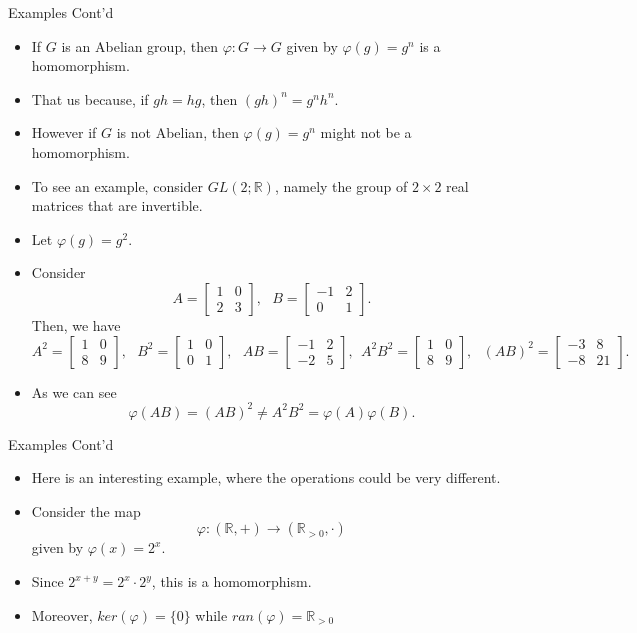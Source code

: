 \documentclass[ %
 10pt, xcolor={dvipsnames,svgnames,x11names,hyperref},
   hyperref={colorlinks=true,citecolor=green,linkcolor=DarkRed,urlcolor=ProcessBlue,anchorcolor=blue}
  ]{beamer}
\newenvironment{stepitemize}{\begin{itemize}[<+->]}{\end{itemize} }
\newcommand{\R}{\mathbb{R}}
\begin{document}
\begin{frame}{Examples Cont'd}
\begin{stepitemize}
    \item If $G$ is an Abelian group, then $\varphi:G\rightarrow G$ given by $\varphi(g)=g^n$ is a homomorphism.
    \item That us because, if $gh=hg$, then $(gh)^n=g^nh^n$.
    \item However if $G$ is not Abelian, then $\varphi(g)=g^n$ might not be a homomorphism.
    \item To see an example, consider $GL(2;\R)$, namely the group of $2\times 2$ real matrices that are invertible. \item Let $\varphi(g)=g^2$.
 \item Consider
 $$ A=\begin{bmatrix}
    1&0\\
    2&3    \end{bmatrix}, \:\:\: B = \begin{bmatrix}
    -1&2\\
    0&1    \end{bmatrix}.$$
    Then, we have
    \scriptsize{
    $$A^2 = \begin{bmatrix}
    1&0\\
    8&9    \end{bmatrix}, \:\:\: B^2 = \begin{bmatrix}
    1&0\\
    0&1    \end{bmatrix}, \:\:\: AB = \begin{bmatrix}
    -1&2\\
    -2&5    \end{bmatrix}, \:\: A^2B^2 = \begin{bmatrix}
    1&0\\
    8&9    \end{bmatrix}, \:\:\: (AB)^2 = \begin{bmatrix}
    -3&8\\
    -8&21    \end{bmatrix}.$$ }
    \item As we can see $$\varphi(AB) = (AB)^2 \neq A^2B^2 =\varphi(A)\varphi(B).$$
\end{stepitemize}

\end{frame}
\begin{frame}{Examples Cont'd}
\begin{stepitemize}
    \item Here is an interesting example, where the operations could be very different.
    \item Consider the map
$$\varphi: \left( \R, +\right) \rightarrow  \left (\R_{>0}, \cdot \right )$$ given by
$\varphi(x)=2^x$.
\item Since $2^{x+y} = 2^x\cdot 2^y$, this is a homomorphism. \item Moreover, $ker(\varphi) = \{0\}$ while $ran(\varphi) = \R_{>0}$

\end{stepitemize}
\end{frame}
\end{document}
